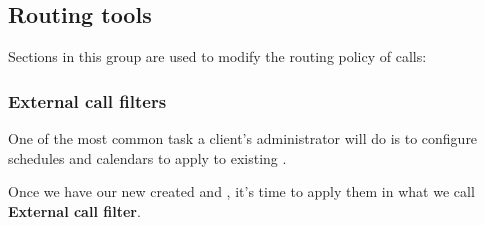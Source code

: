 \documentclass[letterpaper,10pt,english]{sphinxmanual}
\begin{document}
\subsection{Routing tools}
\label{administration_portal/client/vpbx/routing_tools/index::doc}\label{administration_portal/client/vpbx/routing_tools/index:routing-tools}
Sections in this group are used to modify the routing policy of calls:


\subsubsection{External call filters}
\label{administration_portal/client/vpbx/routing_tools/external_call_filters:external-call-filters}\label{administration_portal/client/vpbx/routing_tools/external_call_filters:external-filters}\label{administration_portal/client/vpbx/routing_tools/external_call_filters::doc}
One of the most common task a client's administrator will do is to
configure schedules and calendars to apply to existing {\hyperref[administration_portal/client/vpbx/ddis:ddis]{}}.

Once we have our new created {\hyperref[administration_portal/client/vpbx/routing_tools/schedules:schedules]{}} and {\hyperref[administration_portal/client/vpbx/routing_tools/calendars:calendars]{}}, it's time to apply them
in what we call \textbf{External call filter}.
\end{document}
